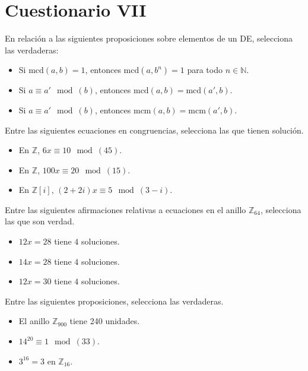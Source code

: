 \section{Cuestionario VII}

\begin{ejercicio}
    En relación a las siguientes proposiciones sobre elementos de un DE, selecciona las verdaderas:
    \begin{itemize}
        \item Si $\text{mcd}(a,b)=1$, entonces $\text{mcd}(a,b^n)=1$ para todo $n \in \mathbb{N}$.
        \item Si $a \equiv a'\mod(b)$, entonces $\text{mcd}(a,b)=\text{mcd}(a',b)$.
        \item Si $a\equiv a'\mod(b)$, entonces $\text{mcm}(a,b)=\text{mcm}(a',b)$.
    \end{itemize}
\end{ejercicio}

\begin{ejercicio}
    Entre las siguientes ecuaciones en congruencias, selecciona las que tienen solución.
    \begin{itemize}
        \item En $\mathbb{Z}$, $6x\equiv 10 \mod (45)$.
        \item En $\mathbb{Z}$, $100x\equiv 20\mod (15)$.
        \item En $\mathbb{Z}[i]$, $(2+2i)x\equiv 5\mod(3-i)$.
    \end{itemize}
\end{ejercicio}

\begin{ejercicio}
    Entre las siguientes afirmaciones relativas a ecuaciones en el anillo $\mathbb{Z}_{64}$, selecciona las que son verdad.
    \begin{itemize}
        \item $12x=28$ tiene $4$ soluciones.
        \item $14x=28$ tiene $4$ soluciones.
        \item $12x=30$ tiene $4$ soluciones.
    \end{itemize}
\end{ejercicio}

\begin{ejercicio}
    Entre las siguientes proposiciones, selecciona las verdaderas.
    \begin{itemize}
        \item El anillo $\mathbb{Z}_{900}$ tiene 240 unidades.
        \item $14^{20}\equiv 1\mod (33)$.
        \item $3^{16}=3$ en $\mathbb{Z}_{16}$.
    \end{itemize}
\end{ejercicio}

